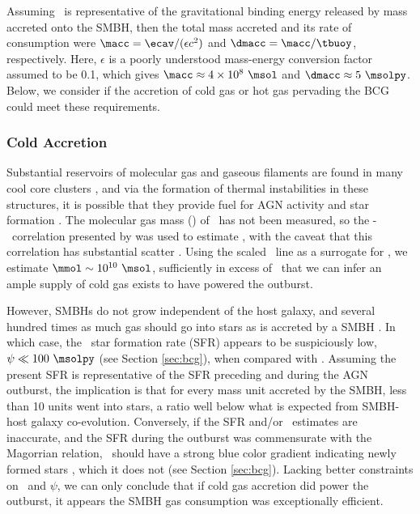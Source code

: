 \documentclass[iop]{emulateapj}
\begin{document}
Assuming \ecav\ is representative of the gravitational binding energy
released by mass accreted onto the SMBH, then the total mass accreted
and its rate of consumption were $\macc = \ecav/(\epsilon c^2)$ and
$\dmacc = \macc/\tbuoy$, respectively. Here, $\epsilon$ is a poorly
understood mass-energy conversion factor assumed to be 0.1, which
gives $\macc \approx 4 \times 10^8 ~\msol$ and $\dmacc \approx 5
~\msolpy$. Below, we consider if the accretion of cold gas or hot gas
pervading the BCG could meet these requirements.

\subsubsection{Cold Accretion}

Substantial reservoirs of molecular gas and gaseous filaments are
found in many cool core clusters \citep{crawford99, edge01}, and via
the formation of thermal instabilities in these structures, it is
possible that they provide fuel for AGN activity and star formation
\citep[\eg][]{pizzolato05, 2010arXiv1003.4181P}. The molecular gas
mass (\mmol) of \rbs\ has not been measured, so the
\halpha-\mmol\ correlation presented by \citet{edge01} was used to
estimate \mmol, with the caveat that this correlation has substantial
scatter \citep{salome03}. Using the scaled \hbeta\ line as a surrogate
for \halpha, we estimate $\mmol \sim 10^{10} ~\msol$, sufficiently in
excess of \macc\ that we can infer an ample supply of cold gas exists
to have powered the outburst.

However, SMBHs do not grow independent of the host galaxy, and several
hundred times as much gas should go into stars as is accreted by a
SMBH \citep{1995ARA&A..33..581K, magorrian}. In which case, the
\rbs\ star formation rate (SFR) appears to be suspiciously low, $\psi
\ll 100 ~\msolpy$ (see Section \ref{sec:bcg}), when compared with
\dmacc. Assuming the present SFR is representative of the SFR
preceding and during the AGN outburst, the implication is that for
every mass unit accreted by the SMBH, less than 10 units went into
stars, a ratio well below what is expected from SMBH-host galaxy
co-evolution. Conversely, if the SFR and/or \dmacc\ estimates are
inaccurate, and the SFR during the outburst was commensurate with the
Magorrian relation, \rbs\ should have a strong blue color gradient
indicating newly formed stars \citep{rafferty08}, which it does not
(see Section \ref{sec:bcg}). Lacking better constraints on \mmol\ and
$\psi$, we can only conclude that if cold gas accretion did power the
outburst, it appears the SMBH gas consumption was exceptionally
efficient.
\end{document}
